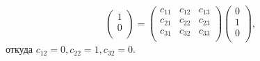 \documentclass[a4paper,12pt]{article}
\theoremstyle{definition}
\begin{document}
\begin{itemize}[leftmargin=1cm]
\[\begin{pmatrix}
            1 \\
            0 \\
        \end{pmatrix}
        = 
        \begin{pmatrix}
            c_{11} & c_{12} & c_{13} \\
            c_{21} & c_{22} & c_{23} \\
            c_{31} & c_{32} & c_{33} \\
        \end{pmatrix}
        \begin{pmatrix}
            0 \\
            1 \\
            0 \\
        \end{pmatrix}
        ,\] 
        откуда \(c_{12} = 0, c_{22} = 1, c_{32} = 0\). 
            

\end{itemize}
\end{document}
